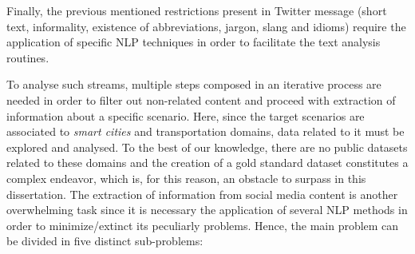 Finally, the previous mentioned restrictions present in Twitter message (short text, informality, existence of abbreviations, jargon, slang and idioms) require the application of specific \gls{NLP} techniques in order to facilitate the text analysis routines.
\fi

\iffalse
To analyse such streams, multiple steps composed in an iterative process are needed in order to filter out non-related content and proceed with extraction of information about a specific scenario. Here, since the target scenarios are associated to \textit{smart cities} and transportation domains, data related to it must be explored and analysed. To the best of our knowledge, there are no public datasets related to these domains and the creation of a gold standard dataset constitutes a complex endeavor, which is, for this reason, an obstacle to surpass in this dissertation. The extraction of information from social media content is another overwhelming task since it is necessary the application of several \gls{NLP} methods in order to minimize/extinct its peculiarly problems. Hence, the main problem can be divided in five distinct sub-problems:

